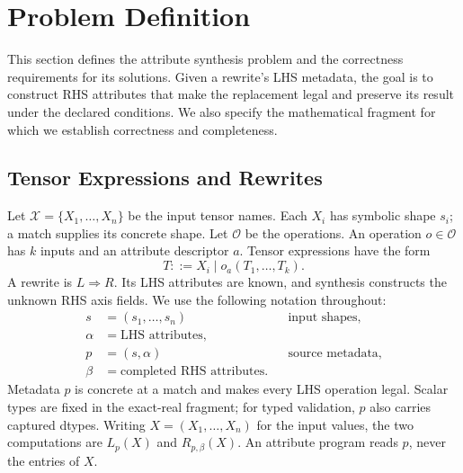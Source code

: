 \section{Problem Definition}
\label{sec:problem}
This section defines the attribute synthesis problem and the correctness
requirements for its solutions. Given a rewrite's LHS metadata, the goal is
to construct RHS attributes that make the replacement legal and preserve
its result under the declared conditions. We also specify the mathematical
fragment for which we establish correctness and completeness.

\subsection{Tensor Expressions and Rewrites}
Let $\mathcal X=\{X_1,\ldots,X_n\}$ be the input tensor names. Each $X_i$ has
symbolic shape $s_i$; a match supplies its concrete shape. Let $\mathcal O$
be the operations. An operation $o\in\mathcal O$ has $k$ inputs and an
attribute descriptor $a$. Tensor expressions have the form
\begin{equation}
 T ::= X_i \mid o_a(T_1,\ldots,T_k).
\end{equation}
A rewrite is $L\Rightarrow R$. Its LHS attributes are known, and synthesis
constructs the unknown RHS axis fields. We use the following notation throughout:
\begin{equation}
\begin{aligned}
 s&=(s_1,\ldots,s_n) &&\text{input shapes},\\
 \alpha&=\text{LHS attributes},\\
 p&=(s,\alpha) &&\text{source metadata},\\
 \beta&=\text{completed RHS attributes}.
\end{aligned}
\label{eq:metadata}
\end{equation}
Metadata $p$ is concrete at a match and makes every LHS operation legal.
Scalar types are fixed in the exact-real fragment; for typed validation,
$p$ also carries captured dtypes.
Writing $X=(X_1,\ldots,X_n)$ for the input values, the two computations are
$L_p(X)$ and $R_{p,\beta}(X)$. An attribute program reads $p$, never the
entries of $X$.

